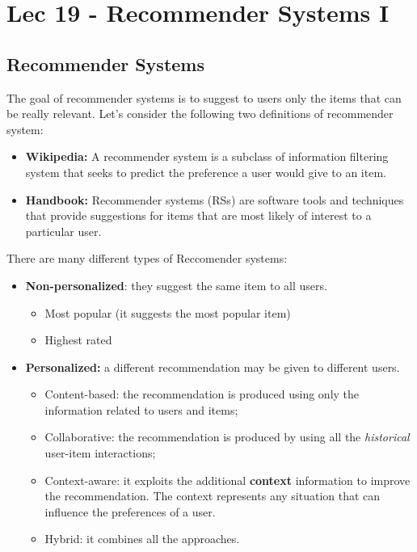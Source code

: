 \chapter{Lec 19 - Recommender Systems I}
\section{Recommender Systems}
The goal of recommender systems is to suggest to users only the items that can be really relevant. Let's consider the following two definitions of recommender system:
\begin{itemize}
    \item \textbf{Wikipedia:} A recommender system is a subclass of information filtering system that seeks to predict the preference a user would give to an item.
    \item \textbf{Handbook:} Recommender systems (RSs) are software tools and techniques that provide suggestions for items that are most likely of interest to a particular user.
\end{itemize}
There are many different types of Reccomender systems:
\begin{itemize}
    \item \textbf{Non-personalized}: they suggest the same item to all users.
    \begin{itemize}
        \item Most popular (it suggests the most popular item)
        \item Highest rated
    \end{itemize}
    \item \textbf{Personalized:} a different recommendation may be given to different users.
    \begin{itemize}
        \item Content-based: the recommendation is produced using only the information related to users and items;
        
        \item Collaborative: the recommendation is produced by using all the \textit{historical} user-item interactions;

        \item Context-aware: it exploits the additional \textbf{context} information to improve the recommendation. The context represents any situation that can influence the preferences of a user. 

        \item Hybrid: it combines all the approaches.
    \end{itemize}
\end{itemize}
